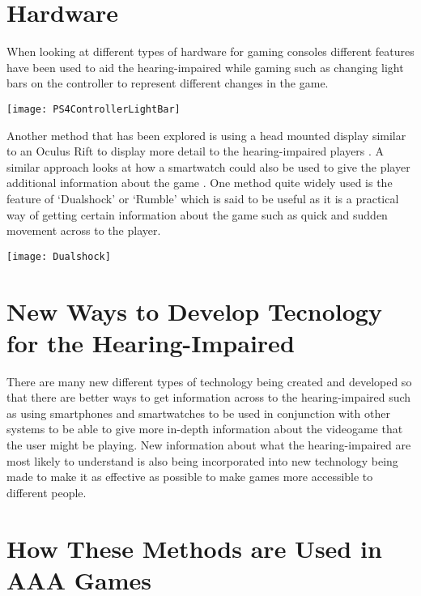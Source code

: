 \documentclass{scrartcl}
\begin{document}
\section{Hardware}

When looking at different types of hardware for gaming consoles different features have been used to aid the hearing-impaired while gaming such as changing light bars on the controller to represent different changes in the game.

\texttt{[image: PS4ControllerLightBar]}

Another method that has been explored is using a head mounted display similar to an Oculus Rift to display more detail to the hearing-impaired players \cite{Jones}. A similar approach looks at how a smartwatch could also be used to give the player additional information about the game \cite{Mielke}.
One method quite widely used is the feature of `Dualshock' or `Rumble' which is said to be useful as it is a practical way \cite{Distante} of getting certain information about the game such as quick and sudden movement across to the player.

\begin{center}
	\texttt{[image: Dualshock]}
\end{center}
\section{New Ways to Develop Tecnology for the Hearing-Impaired}

There are many new different types of technology being created and developed so that there are better ways to get information across to the hearing-impaired such as using smartphones and smartwatches \cite{Mielke} to be used in conjunction with other systems to be able to give more in-depth information about the videogame that the user might be playing. New information about what the hearing-impaired are most likely to understand \cite{Lawrence} is also being incorporated into new technology being made to make it as effective as possible to make games more accessible to different people.

\section{How These Methods are Used in AAA Games}
\end{document}
